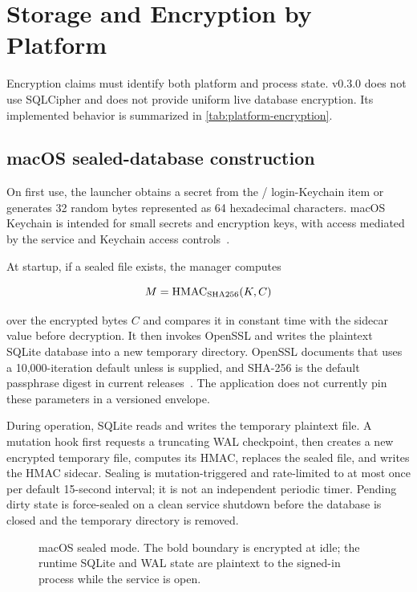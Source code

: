 \section{Storage and Encryption by Platform}
\label{sec:encryption}

Encryption claims must identify both platform and process state. \system{} v0.3.0 does not use SQLCipher and does not provide uniform live database encryption. Its implemented behavior is summarized in \cref{tab:platform-encryption}.

\subsection{macOS sealed-database construction}

On first use, the launcher obtains a secret from the / login-Keychain item or generates 32 random bytes represented as 64 hexadecimal characters. macOS Keychain is intended for small secrets and encryption keys, with access mediated by the  service and Keychain access controls~\cite{applekeychain}.

At startup, if a sealed file exists, the manager computes

\begin{equation}
M=\operatorname{HMAC}_{\mathrm{SHA256}}(K,C)
\end{equation}

over the encrypted bytes $C$ and compares it in constant time with the sidecar value before decryption. It then invokes OpenSSL  and writes the plaintext SQLite database into a new temporary directory. OpenSSL documents that  uses a 10,000-iteration default unless  is supplied, and SHA-256 is the default passphrase digest in current releases~\cite{opensslenc}. The application does not currently pin these parameters in a versioned envelope.

During operation, SQLite reads and writes the temporary plaintext file. A mutation hook first requests a truncating WAL checkpoint, then creates a new encrypted temporary file, computes its HMAC, replaces the sealed file, and writes the HMAC sidecar. Sealing is mutation-triggered and rate-limited to at most once per default 15-second interval; it is not an independent periodic timer. Pending dirty state is force-sealed on a clean service shutdown before the database is closed and the temporary directory is removed.

\begin{figure}[t]
  \centering
  
  \caption{macOS sealed mode. The bold boundary is encrypted at idle; the runtime SQLite and WAL state are plaintext to the signed-in process while the service is open.}
  \label{fig:macos-seal}
\end{figure}


